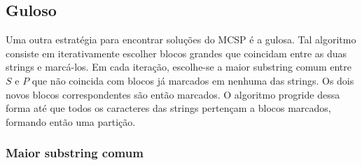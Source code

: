 \subsection{Guloso}

    Uma outra estratégia para encontrar soluções do MCSP é a gulosa. Tal algoritmo consiste em iterativamente escolher blocos grandes que coincidam entre as duas strings e marcá-los. Em cada iteração, escolhe-se a maior substring comum entre $S$ e $P$ que não coincida com blocos já marcados em nenhuma das strings. Os dois novos blocos correspondentes são então marcados. O algoritmo progride dessa forma até que todos os caracteres das strings pertençam a blocos marcados, formando então uma partição.

    \subsubsection{Maior substring comum}

